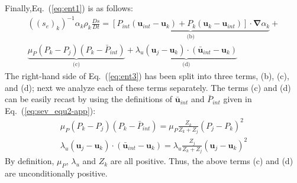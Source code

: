 \documentclass[preprint,10pt]{elsarticle}
\newcommand{\grad}{\mbold{\nabla}}
\newcommand{\mbold}[1]{\boldsymbol#1}
\newcommand{\eqt}[1]{Eq.~(\ref{#1})}                     %
\begin{document}
\begin{appendices}
Finally,\eqt{eq:ent1} is as follows:
\begin{eqnarray}
\label{eq:ent3}
((s_e)_k)^{-1} \alpha_k \rho_k \frac{Ds}{Dt} = \underbrace{\left[ P_{int} (\mbold u_{int}-\mbold u_k) + P_k (\mbold u_k-\mbold u_{int}) \right] \cdot \grad \alpha_k}_\textrm{(b)} + \nonumber\\ 
\underbrace{\mu_P (P_k-P_j)(P_k-\bar{P}_{int})}_\textrm{(c)} + \underbrace{\lambda_u(\mbold u_j-\mbold u_k)\cdot(\bar{\mbold u}_{int}-\mbold u_k)}_\textrm{(d)}
\end{eqnarray}
The right-hand side of \eqt{eq:ent3} has been split into three terms, (b), (c), and (d); next we analyze each of these terms separately. The terms (c) and (d) can be easily recast by using the definitions of $\bar{\mbold u}_{int}$ and $\bar{P}_{int}$ given in \eqt{eq:sev_equ2-app}:
\begin{eqnarray}
\label{eq:ent4}
\mu_P (P_k-P_j)(P_k-\bar{P}_{int}) = \mu_P \frac{Z_k}{Z_k+Z_j} (P_j - P_k)^2\nonumber\\
\lambda_u(\mbold u_j-\mbold u_k)\cdot(\bar{\mbold u}_{int}-\mbold u_k) = \lambda_u \frac{Z_j}{Z_k+Z_j} (\mbold u_j - \mbold u_k)^2 
\end{eqnarray}
By definition, $\mu_P$, $\lambda_u$ and $Z_k$ are all positive. Thus, the above terms (c) and (d) are unconditionally positive. 


\end{appendices}
\end{document}
